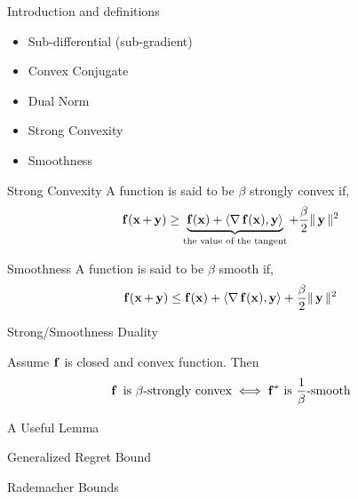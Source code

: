
\begin{frame}{Introduction and definitions}
\begin{itemize}
\item Sub-differential (sub-gradient)
\item Convex Conjugate
\item Dual Norm
\item Strong Convexity
\item Smoothness
\end{itemize}
\end{frame}

\begin{frame}{Strong Convexity}
A function is said to be $\beta$ strongly convex if,
\begin{align*}
\f(\x+\y) \ge \underbrace{\f(\x) + \dotprod{\grad \f(\x)}{\y}}_{\text{the value of the tangent}} +\frac{\beta}{2} \|\y\|^2
\end{align*}

\end{frame}

\begin{frame}{Smoothness}
A function is said to be $\beta$ smooth if,
\begin{align*}
\f(\x+\y) \le \f(\x) + \dotprod{\grad \f(\x)}{\y} +\frac{\beta}{2} \|\y\|^2
\end{align*}
\end{frame}

\begin{frame}{Strong/Smoothness Duality}
\begin{theorem}
Assume $\f$ is closed and convex function. Then
\begin{align*}
\f \text{ is } \beta\text{-strongly convex} \iff \opt{\f} \text{ is } \frac{1}{\beta}\text{-smooth}
\end{align*}
\end{theorem}
\end{frame}

\begin{frame}{A Useful Lemma}
\end{frame}

\begin{frame}{Generalized Regret Bound}
\end{frame}


\begin{frame}{Rademacher Bounds}
\end{frame}
